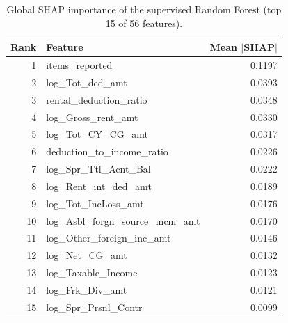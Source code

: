 \begin{table}[H]
    \centering
    \caption{Global SHAP importance of the supervised Random Forest (top 15 of 56 features).}
    \label{tab:app_shap_rf}
    \footnotesize
    \begin{tabular}{rlr}
        \toprule
        Rank & Feature & Mean $|$SHAP$|$ \\
        \midrule
        1 & items\_reported & 0.1197 \\
        2 & log\_Tot\_ded\_amt & 0.0393 \\
        3 & rental\_deduction\_ratio & 0.0348 \\
        4 & log\_Gross\_rent\_amt & 0.0330 \\
        5 & log\_Tot\_CY\_CG\_amt & 0.0317 \\
        6 & deduction\_to\_income\_ratio & 0.0226 \\
        7 & log\_Spr\_Ttl\_Acnt\_Bal & 0.0222 \\
        8 & log\_Rent\_int\_ded\_amt & 0.0189 \\
        9 & log\_Tot\_IncLoss\_amt & 0.0176 \\
        10 & log\_Asbl\_forgn\_source\_incm\_amt & 0.0170 \\
        11 & log\_Other\_foreign\_inc\_amt & 0.0146 \\
        12 & log\_Net\_CG\_amt & 0.0132 \\
        13 & log\_Taxable\_Income & 0.0123 \\
        14 & log\_Frk\_Div\_amt & 0.0121 \\
        15 & log\_Spr\_Prsnl\_Contr & 0.0099 \\
        \bottomrule
    \end{tabular}
\end{table}

